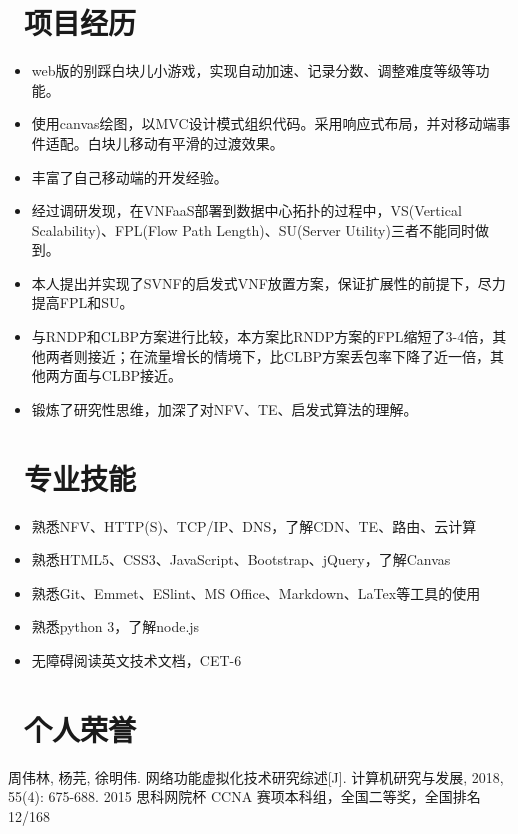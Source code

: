 \documentclass{resume}
\begin{document}
\section{\faUsers\ 项目经历}
\begin{onehalfspacing}
\begin{itemize}
  \item web版的别踩白块儿小游戏，实现自动加速、记录分数、调整难度等级等功能。
  \item 使用canvas绘图，以MVC设计模式组织代码。采用响应式布局，并对移动端事件适配。白块儿移动有平滑的过渡效果。
  \item 丰富了自己移动端的开发经验。
\end{itemize}
\end{onehalfspacing}
\begin{onehalfspacing}
\begin{itemize}
  \item 经过调研发现，在VNFaaS部署到数据中心拓扑的过程中，VS(Vertical Scalability)、FPL(Flow Path Length)、SU(Server Utility)三者不能同时做到。
  \item 本人提出并实现了SVNF的启发式VNF放置方案，保证扩展性的前提下，尽力提高FPL和SU。
  \item 与RNDP和CLBP方案进行比较，本方案比RNDP方案的FPL缩短了3-4倍，其他两者则接近；在流量增长的情境下，比CLBP方案丢包率下降了近一倍，其他两方面与CLBP接近。
  \item 锻炼了研究性思维，加深了对NFV、TE、启发式算法的理解。
\end{itemize}
\end{onehalfspacing}


\section{\faCogs\ 专业技能}
\begin{itemize}[parsep=0.5ex]
  \item 熟悉NFV、HTTP(S)、TCP/IP、DNS，了解CDN、TE、路由、云计算
  \item 熟悉HTML5、CSS3、JavaScript、Bootstrap、jQuery，了解Canvas
  \item 熟悉Git、Emmet、ESlint、MS Office、Markdown、LaTex等工具的使用
  \item 熟悉python 3，了解node.js
  \item 无障碍阅读英文技术文档，CET-6
\end{itemize}


\section{\faHeartO\ 个人荣誉}
{周伟林, 杨芫, 徐明伟. 网络功能虚拟化技术研究综述[J]. 计算机研究与发展, 2018, 55(4): 675-688.}
{2015 思科网院杯 CCNA 赛项本科组，全国二等奖，全国排名 12/168}
\end{document}
